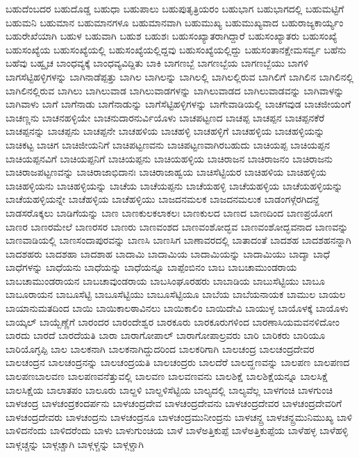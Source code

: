 {ಬಹುದೆಂಬದರ
ಬಹುದೊಡ್ಡ
ಬಹುಧಾ
ಬಹುಪಾಲು
ಬಹುಪುತೃತ್ರಿಯರಂ
ಬಹುಭಾಗ
ಬಹುಭಾಗದಲ್ಲಿ
ಬಹುಮಟ್ಟಿಗೆ
ಬಹುಮನಿ
ಬಹುಮಾನ
ಬಹುಮಾನಗಳೂ
ಬಹುಮಾನವಾಗಿ
ಬಹುಮುಖ್ಯ
ಬಹುಮುಖ್ಯವಾದ
ಬಹುರಾಜ್ಯಕಾರ್ಯ್ಯಂ
ಬಹುರೇಖೆಯಾಗಿ
ಬಹುಳ
ಬಹುವಾಗಿ
ಬಹುಶ
ಬಹುಶಃ
ಬಹುಸಂಖ್ಯಾತರಾಗಿದ್ದಾರೆ
ಬಹುಸಂಖ್ಯಾತರು
ಬಹುಸಂಖ್ಯೆ
ಬಹುಸಂಖ್ಯೆಯ
ಬಹುಸಂಖ್ಯೆಯಲ್ಲಿ
ಬಹುಸಂಖ್ಯೆಯಲ್ಲಿದ್ದವು
ಬಹುಸಂಖ್ಯೆಯಲ್ಲಿದ್ದು
ಬಹುಸಂತಾನಕ್ಷೇಮಸರ್ವ್ವ
ಬಹೆನು
ಬಹೆವು
ಬಹ್ವೃಚ
ಬಾಂಧವ್ಯಕ್ಕೆ
ಬಾಂಧವ್ಯವಿದ್ದಿತು
ಬಾಕಿ
ಬಾಗಣಬ್ಬೆ
ಬಾಗಣಬ್ಬೆಯ
ಬಾಗಣಬ್ಬೆಯು
ಬಾಗಳಿ
ಬಾಗಸೆಟ್ಟಿಹಳ್ಳಿಗಳನ್ನು
ಬಾಗಿನಾಡೆಪ್ಪತ್ತು
ಬಾಗಿಲ
ಬಾಗಿಲನ್ನು
ಬಾಗಿಲಲ್ಲಿ
ಬಾಗಿಲಲ್ಲಿರುವ
ಬಾಗಿಲಿಗೆ
ಬಾಗಿಲಿನ
ಬಾಗಿಲಿನಲ್ಲಿ
ಬಾಗಿಲಿನಲ್ಲಿರುವ
ಬಾಗಿಲು
ಬಾಗಿಲುವಾಡ
ಬಾಗಿಲುವಾಡಗಳನ್ನು
ಬಾಗಿಲುವಾಡದ
ಬಾಗಿಲುವಾಡವನ್ನು
ಬಾಗಿವಾಳನ್ನು
ಬಾಗಿವಾಳು
ಬಾಗೆ
ಬಾಗೆನಾಡು
ಬಾಗೆನಾಡುನ್ನು
ಬಾಗೆಸೆಟ್ಟಿಹಳ್ಳಿಗಳನ್ನು
ಬಾಗೇವಾಡಿಯಲ್ಲಿ
ಬಾಚಗವುಡ
ಬಾಚಜೀಯಂಗೆ
ಬಾಚಣ್ಣನು
ಬಾಚನಹಳ್ಳಿಯೇ
ಬಾಚನುದಾರನುರ್ವಿಯೊಳು
ಬಾಚಪಟ್ಟಣದ
ಬಾಚಪ್ಪ
ಬಾಚಪ್ಪನ
ಬಾಚಪ್ಪನಕೆರೆ
ಬಾಚಪ್ಪನನ್ನು
ಬಾಚಪ್ಪನು
ಬಾಚಪ್ಪನೇ
ಬಾಚಹಳಿಯ
ಬಾಚಹಳ್ಳಿ
ಬಾಚಹಳ್ಳಿಗೆ
ಬಾಚಹಳ್ಳಿಯ
ಬಾಚಹಳ್ಳಿಯನ್ನು
ಬಾಚಿಕಟ್ಟ
ಬಾಚಿಗ
ಬಾಚಿಜೀಯನಿಗೆ
ಬಾಚಿಪಟ್ಟಣವನು
ಬಾಚಿಪಟ್ಟಣವಾಗಿರಬಹುದು
ಬಾಚಿಯಪ್ಪ
ಬಾಚಿಯಪ್ಪನ
ಬಾಚಿಯಪ್ಪನವಿಗೆ
ಬಾಚಿಯಪ್ಪನಿಗೆ
ಬಾಚಿಯಪ್ಪನು
ಬಾಚಿಯಹಳ್ಳಿಯ
ಬಾಚಿರಾಜನ
ಬಾಚಿರಾಜನಂ
ಬಾಚಿರಾಜನು
ಬಾಚಿರಾಜಪಟ್ಟಣವನ್ನು
ಬಾಚಿರಾಜಾಭಿದಾನಃ
ಬಾಚಿರಾಜಾಹ್ವಯ
ಬಾಚಿಸೆಟ್ಟಿಯರ
ಬಾಚಿಹಳಿಯ
ಬಾಚಿಹಳ್ಳಿಯ
ಬಾಚಿಹಳ್ಳಿಯನು
ಬಾಚಿಹಳ್ಳಿಯನ್ನು
ಬಾಚೆಯ
ಬಾಚೆಯಪ್ಪನು
ಬಾಚೆಯಹಳ್ಳಿ
ಬಾಚೆಯಹಳ್ಳಿಯ
ಬಾಚೆಯಹಳ್ಳಿಯನ್ನು
ಬಾಚೆಯಹಳ್ಳಿಯನ್ನೇ
ಬಾಚೆಹಳ್ಳಿಯ
ಬಾಚೆಹಳ್ಳಿಯು
ಬಾಜದನಮಲಕ
ಬಾಜದನಮಲುಕ
ಬಾಡಂಗಳ್ಗೆರಗಿದನ್ದೆ
ಬಾಡಸರೊಕ್ಕಲು
ಬಾಡಿಗೆಯನ್ನು
ಬಾಣ
ಬಾಣಕುಲಕಲಾಕಲಃ
ಬಾಣಕುಲದ
ಬಾಣದ
ಬಾಣದಿಂದ
ಬಾಣಪ್ರಯೋಗ
ಬಾಣರ
ಬಾಣರಮೇಲೆ
ಬಾಣರಸರ
ಬಾಣರು
ಬಾಣವಂಶದ
ಬಾಣವಂಶೋದ್ಭವ
ಬಾಣವಂಶೋದ್ಭವನಾದ
ಬಾಣವನ್ನು
ಬಾಣವಾಡಿಯಲ್ಲಿ
ಬಾಣಸಂದಾಪುರವನ್ನು
ಬಾಣಸಿ
ಬಾಣಸಿಗ
ಬಾಣಾವರದಲ್ಲಿ
ಬಾತಾದಂತೆ
ಬಾದಶಹ
ಬಾದಶಹನನ್ನಾಗಿ
ಬಾದಶಹರು
ಬಾದಶಹಾ
ಬಾದಶಾಹ
ಬಾದಾಮಿ
ಬಾದಾಮಿಯ
ಬಾದಾಮಿಯನ್ನು
ಬಾದಾಮಿಯು
ಬಾದ್ಶಾ
ಬಾಧೆ
ಬಾಧೆಗಳನ್ನು
ಬಾಧೆಯನು
ಬಾಧೆಯನ್ನು
ಬಾಧೆಯನ್ನೂ
ಬಾಪ್ಪೆಂಬಿನಂ
ಬಾಬ
ಬಾಬಚಾಮುಂಡರಾಯ
ಬಾಬಚಾಮುಂಡರಾಯನ
ಬಾಬಚಾವುಂಡರಾಯ
ಬಾಬಸಿಂಘೂರಹರು
ಬಾಬಾಡಿಯ
ಬಾಬುಸೆಟ್ಟಿಯು
ಬಾಬೂ
ಬಾಬೂರಾಯನ
ಬಾಬೂಸೆಟ್ಟಿ
ಬಾಬೂಸೆಟ್ಟಿಯು
ಬಾಬೂಸೆಟ್ಟಿಯೂ
ಬಾಬೆಯ
ಬಾಬೆಯನಾಯಕ
ಬಾಮುಲ
ಬಾಯಲ
ಬಾಯಾನುಮತದಿಂದ
ಬಾಯಿ
ಬಾಯಿಕಾಲಠಾವಿನಲು
ಬಾಯಿಕಾಲಿಂ
ಬಾಯಿದೇವಿ
ಬಾಯುಳ್ಳ
ಬಾಯೊಳಕ್ಕೆ
ಬಾಯೊಳು
ಬಾಯ್ಕಲ್
ಬಾಯ್ಬೆಣ್ಣೆಗೆ
ಬಾರಂದರ
ಬಾರಂದೇಶ್ವರ
ಬಾರಕೂರು
ಬಾರಕೂರುಗಳಿಂದ
ಬಾರಣಾಸಿಯಮವನಳಿದೋಂ
ಬಾರದು
ಬಾರದೆ
ಬಾರದೆಯತಿ
ಬಾರಾ
ಬಾರಾಗೋಪಾಲ್
ಬಾರಾಗೋಪಾಲ್ರವರು
ಬಾರಿ
ಬಾರಿಕರು
ಬಾರಿಯೂ
ಬಾರಿಯೊಗ್ಳಪ್ಪಿ
ಬಾಲ
ಬಾಲಕನಾಗಿ
ಬಾಲಕನಾಗಿದ್ದುದರಿಂದ
ಬಾಲಕರಿಗಾಗಿ
ಬಾಲಚಂದ್ರ
ಬಾಲಚಂದ್ರದೇವರ
ಬಾಲಚಂದ್ರನ
ಬಾಲಚಂದ್ರನನ್ನು
ಬಾಲಚಂದ್ರಯತಿ
ಬಾಲಚಂದ್ರರು
ಬಾಲದೆರೆ
ಬಾಲದ್ಹಣವನ್ನು
ಬಾಲಪಣ
ಬಾಲಪಣದ
ಬಾಲಪಣಬಾಲವಣ
ಬಾಲಪಣವನೆತ್ತುವಲ್ಲಿ
ಬಾಲವಣ
ಬಾಲವಣವನು
ಬಾಲಶಿಕ್ಷೆ
ಬಾಲಶಿಕ್ಷೆಯನ್ನೂ
ಬಾಲಸಿಕ್ಷೆ
ಬಾಲಸಿಕ್ಷೆಯ
ಬಾಲಾತಪಂ
ಬಾಲೂರು
ಬಾಲ್ದಳಿ
ಬಾಲ್ದಳಿಸೆಟ್ಟಿಯ
ಬಾಲ್ಯದಲ್ಲಿ
ಬಾಲ್ಯವೆಲ್ಲ
ಬಾಳಗಂಚಿ
ಬಾಳಗುಂಚಿ
ಬಾಳಚಂದ್ರ
ಬಾಳಚಂದ್ರಕಂದರ್ಪನು
ಬಾಳಚಂದ್ರದೇವ
ಬಾಳಚಂದ್ರದೇವನು
ಬಾಳಚಂದ್ರದೇವರ
ಬಾಳಚಂದ್ರದೇವರಿಗೆ
ಬಾಳಚಂದ್ರದೇವರು
ಬಾಳಚಂದ್ರನು
ಬಾಳಚಂದ್ರನೂ
ಬಾಳಚಂದ್ರಮುನೀಂದ್ರನು
ಬಾಳಚನ್ದ್ರ
ಬಾಳಚನ್ದ್ರಮುನಿಮುಖ್ಯ
ಬಾಳಿ
ಬಾಳಿದನೆಂದು
ಬಾಳಿದರೆಂದು
ಬಾಳು
ಬಾಳುಗುಂಚಿಯ
ಬಾಳೆ
ಬಾಳೆಅತ್ತಿಕುಪ್ಪೆ
ಬಾಳೆಅತ್ತಿಕುಪ್ಪೆಯ
ಬಾಳೆಹಳ್ಳ
ಬಾಳೆಹಳ್ಳಿ
ಬಾಳ್ಗಚ್ಚನ್ನು
ಬಾಳ್ಗಚ್ಚಾಗಿ
ಬಾಳ್ಗಳ್ಚನ್ನು
ಬಾಳ್ಗಳ್ಚಾಗಿ
}
